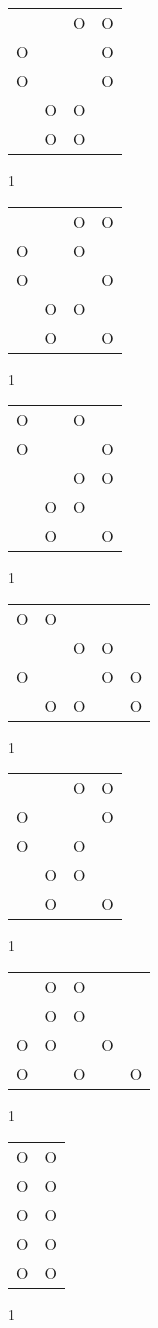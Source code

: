 \begin{tabular}{|m{0.2cm}m{0.2cm}m{0.2cm}m{0.2cm}|}\hline
 & &O&O\\
O& & &O\\
O& & &O\\
 &O&O& \\
 &O&O& \\
\hline\end{tabular}1
\begin{tabular}{|m{0.2cm}m{0.2cm}m{0.2cm}m{0.2cm}|}\hline
 & &O&O\\
O& &O& \\
O& & &O\\
 &O&O& \\
 &O& &O\\
\hline\end{tabular}1
\begin{tabular}{|m{0.2cm}m{0.2cm}m{0.2cm}m{0.2cm}|}\hline
O& &O& \\
O& & &O\\
 & &O&O\\
 &O&O& \\
 &O& &O\\
\hline\end{tabular}1
\begin{tabular}{|m{0.2cm}m{0.2cm}m{0.2cm}m{0.2cm}m{0.2cm}|}\hline
O&O& & & \\
 & &O&O& \\
O& & &O&O\\
 &O&O& &O\\
\hline\end{tabular}1
\begin{tabular}{|m{0.2cm}m{0.2cm}m{0.2cm}m{0.2cm}|}\hline
 & &O&O\\
O& & &O\\
O& &O& \\
 &O&O& \\
 &O& &O\\
\hline\end{tabular}1
\begin{tabular}{|m{0.2cm}m{0.2cm}m{0.2cm}m{0.2cm}m{0.2cm}|}\hline
 &O&O& & \\
 &O&O& & \\
O&O& &O& \\
O& &O& &O\\
\hline\end{tabular}1
\begin{tabular}{|m{0.2cm}m{0.2cm}|}\hline
O&O\\
O&O\\
O&O\\
O&O\\
O&O\\
\hline\end{tabular}1
